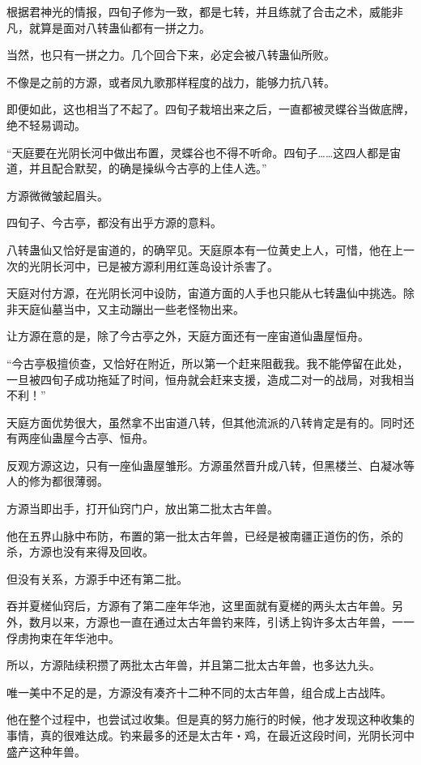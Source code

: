 
\begin{this_body}

根据君神光的情报，四旬子修为一致，都是七转，并且练就了合击之术，威能非凡，就算是面对八转蛊仙都有一拼之力。

当然，也只有一拼之力。几个回合下来，必定会被八转蛊仙所败。

不像是之前的方源，或者凤九歌那样程度的战力，能够力抗八转。

即便如此，这也相当了不起了。四旬子栽培出来之后，一直都被灵蝶谷当做底牌，绝不轻易调动。

“天庭要在光阴长河中做出布置，灵蝶谷也不得不听命。四旬子……这四人都是宙道，并且配合默契，的确是操纵今古亭的上佳人选。”

方源微微皱起眉头。

四旬子、今古亭，都没有出乎方源的意料。

八转蛊仙又恰好是宙道的，的确罕见。天庭原本有一位黄史上人，可惜，他在上一次的光阴长河中，已是被方源利用红莲岛设计杀害了。

天庭对付方源，在光阴长河中设防，宙道方面的人手也只能从七转蛊仙中挑选。除非天庭仙墓当中，又主动蹦出一些老怪物出来。

让方源在意的是，除了今古亭之外，天庭方面还有一座宙道仙蛊屋恒舟。

“今古亭极擅侦查，又恰好在附近，所以第一个赶来阻截我。我不能停留在此处，一旦被四旬子成功拖延了时间，恒舟就会赶来支援，造成二对一的战局，对我相当不利！”

天庭方面优势很大，虽然拿不出宙道八转，但其他流派的八转肯定是有的。同时还有两座仙蛊屋今古亭、恒舟。

反观方源这边，只有一座仙蛊屋雏形。方源虽然晋升成八转，但黑楼兰、白凝冰等人的修为都很薄弱。

方源当即出手，打开仙窍门户，放出第二批太古年兽。

他在五界山脉中布防，布置的第一批太古年兽，已经是被南疆正道伤的伤，杀的杀，方源也没有来得及回收。

但没有关系，方源手中还有第二批。

吞并夏槎仙窍后，方源有了第二座年华池，这里面就有夏槎的两头太古年兽。另外，数月以来，方源也一直在通过太古年兽钓来阵，引诱上钩许多太古年兽，一一俘虏拘束在年华池中。

所以，方源陆续积攒了两批太古年兽，并且第二批太古年兽，也多达九头。

唯一美中不足的是，方源没有凑齐十二种不同的太古年兽，组合成上古战阵。

他在整个过程中，也尝试过收集。但是真的努力施行的时候，他才发现这种收集的事情，真的很难达成。钓来最多的还是太古年・鸡，在最近这段时间，光阴长河中盛产这种年兽。


\end{this_body}

